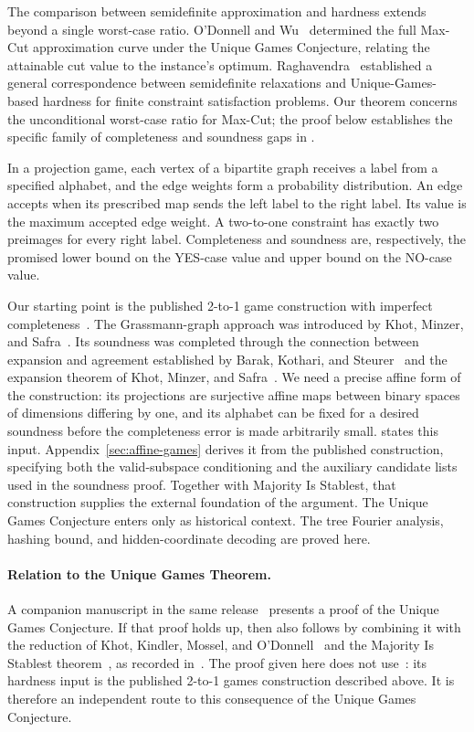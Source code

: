The comparison between semidefinite approximation and hardness extends
beyond a single worst-case ratio. O'Donnell and Wu~\cite{OW08}
determined the full Max-Cut approximation curve under the Unique Games
Conjecture, relating the attainable cut value to the instance's optimum.
Raghavendra~\cite{Raghavendra08} established a general correspondence
between semidefinite relaxations and Unique-Games-based hardness for
finite constraint satisfaction problems. Our theorem concerns the
unconditional worst-case ratio for Max-Cut; the proof below establishes
the specific family of completeness and soundness gaps in
.

In a projection game, each vertex of a bipartite graph receives a label
from a specified alphabet, and the edge weights form a probability
distribution. An edge accepts when its prescribed map sends the left label to the
right label. Its value is the maximum accepted edge weight. A two-to-one
constraint has exactly two preimages for every right label. Completeness
and soundness are, respectively, the promised lower bound on the YES-case
value and upper bound on the NO-case value.

Our starting point is the published 2-to-1 game construction with imperfect
completeness~\cite{DKKMS25}. The Grassmann-graph approach was introduced
by Khot, Minzer, and Safra~\cite{KMS25}. Its soundness was completed
through the connection between expansion and agreement established by
Barak, Kothari, and Steurer~\cite{BKS19} and the expansion theorem of
Khot, Minzer, and Safra~\cite{KMS23}. We need a precise affine form of the
construction: its projections are surjective affine maps between binary
spaces of dimensions differing by one, and its alphabet can be fixed for a
desired soundness before the completeness error is made arbitrarily small.
 states this input. Appendix~\ref{sec:affine-games}
derives it from the published construction, specifying both the
valid-subspace conditioning and the auxiliary candidate lists used in
the soundness proof.
Together with Majority Is Stablest, that construction supplies the
external foundation of the argument. The Unique Games Conjecture enters
only as historical context. The tree Fourier analysis, hashing bound,
and hidden-coordinate decoding are proved here.

\paragraph{Relation to the Unique Games Theorem.}
A companion manuscript in the same release~\cite{OpenAIUniqueGames2026}
presents a proof of the Unique Games Conjecture. If that proof holds up,
then  also follows by combining it with the reduction of
Khot, Kindler, Mossel, and O'Donnell~\cite{KKMO07} and the Majority Is
Stablest theorem~\cite{MOO10}, as recorded
in~\cite[Section~8]{OpenAIUniqueGames2026}. The proof given here does not
use~\cite{OpenAIUniqueGames2026}: its hardness input is the published
2-to-1 games construction described above. It is therefore an
independent route to this consequence of the Unique Games Conjecture.

